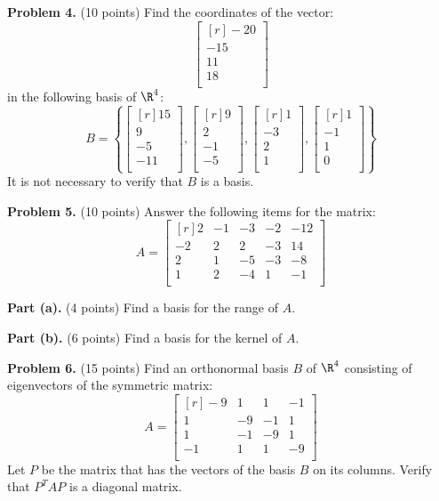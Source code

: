 \documentclass[12pt]{article}
\begin{document}
\textbf{Problem 4.} (10 points) Find the coordinates of the vector:
\[
\begin{bmatrix*}[r]-20\\ -15\\ 11\\ 18\\ \end{bmatrix*}
\]
in the following basis of $\R^4$:
\[
B=\left\{
\begin{bmatrix*}[r]15\\ 9\\ -5\\ -11\\ \end{bmatrix*},\begin{bmatrix*}[r]9\\ 2\\ -1\\ -5\\ \end{bmatrix*},\begin{bmatrix*}[r]1\\ -3\\ 2\\ 1\\ \end{bmatrix*},\begin{bmatrix*}[r]1\\ -1\\ 1\\ 0\\ \end{bmatrix*}
\right\}
\]
It is not necessary to verify that $B$ is a basis.

\clearpage

\textbf{Problem 5.} (10 points) Answer the following items for the matrix:
\[
A = \begin{bmatrix*}[r]2&-1&-3&-2&-12\\-2&2&2&-3&14\\2&1&-5&-3&-8\\1&2&-4&1&-1\\\end{bmatrix*}
\]

\textbf{Part (a).} (4 points) Find a basis for the range of $A$.

\clearpage

\textbf{Part (b).} (6 points) Find a basis for the kernel of $A$.

\clearpage

\textbf{Problem 6.} (15 points) Find an orthonormal basis $B$ of $\R^4$ consisting of eigenvectors of the symmetric matrix:
\[
A = \begin{bmatrix*}[r]-9&1&1&-1\\1&-9&-1&1\\1&-1&-9&1\\-1&1&1&-9\\\end{bmatrix*}
\]
Let $P$ be the matrix that has the vectors of the basis $B$ on its columns. Verify that $P^TAP$ is a diagonal matrix.
\end{document}
